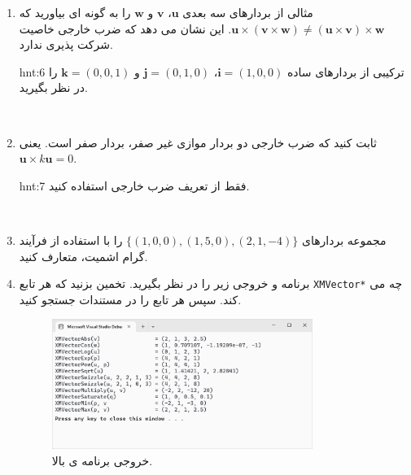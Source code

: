 {\begin{spacing}{1.5}
\begin{enumerate}[label=\textbf{\arabic*}.]
\begin{figure}[H]
                \caption {متوازی الاضلاع توسط دو بردار سه بعدی $\textbf{u}$ و $\textbf{v}$. متوازی الاضلاع دارای پایه $\norm{\textbf{v}}$ و ارتفاع $\textbf{h}$ است.}
                \label{fig:4.Session.1.1.21}
            \end{figure}
            \\
            \item {مثالی از بردارهای سه بعدی $\textbf{u}$، $\textbf{v}$ و $\textbf{w}$ را به گونه ای بیاورید که $\textbf{u}\times(\textbf{v}\times\textbf{w})\neq(\textbf{u}\times\textbf{v})\times\textbf{w}$. این نشان می دهد که ضرب خارجی خاصیت شرکت پذیری ندارد.}
            \begin{hint}{hnt:6}
                \Large
                ترکیبی از بردارهای ساده $\textbf{i}=(1,0,0)$، $\textbf{j}=(0,1,0)$ و $\textbf{k}=(0,0,1)$ را در نظر بگیرید.
            \end{hint}
            \\
            \item {ثابت کنید که ضرب خارجی دو بردار موازی غیر صفر، بردار صفر است. یعنی $\textbf{u}\times k\textbf{u}=0$.}
            \begin{hint}{hnt:7}
                \Large
                فقط از تعریف ضرب خارجی استفاده کنید.
            \end{hint}
            \\
            \item {مجموعه بردارهای $\{(1, 0, 0), (1, 5, 0), (2, 1, -4)\}$ را با استفاده از فرآیند گرام اشمیت، متعارف کنید.}
            \\
            \item {برنامه و خروجی زیر را در نظر بگیرید.
            تخمین بزنید که هر تابع \texttt{XMVector*} چه می کند. سپس هر تابع را در مستندات  جستجو کنید.}
            \textbf{\vspace{6pt}}
            \lr{}
            \textbf{\vspace{-40pt}}
            \begin{figure}[H]
                \centering
                \setlength{\belowcaptionskip}{-10pt}
                \includegraphics[width=0.8\textwidth]{Images/4/1/4.Session.1.1.22}
                \caption {خروجی برنامه ی بالا.}
                \label{fig:4.Session.1.1.22}
            \end{figure}
        \end{enumerate}
    \end{spacing}
}